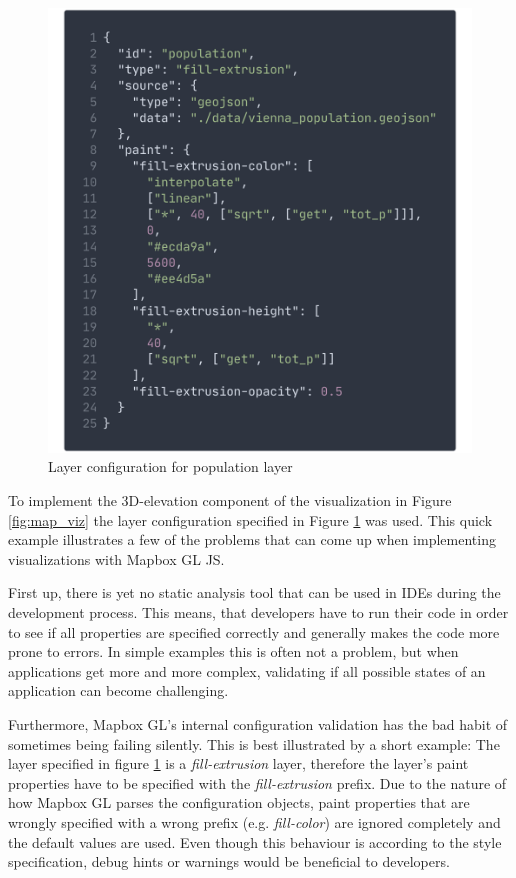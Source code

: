 \documentclass[conference]{IEEEtran}
\begin{document}
\begin{figure}
    \centering
    \includegraphics[width=\columnwidth]{img/vienna-mapbox.png}
    \caption{Layer configuration for population layer}
    \label{fig:mapbox-config}
\end{figure}
To implement the 3D-elevation component of the visualization in Figure \ref{fig:map_viz} the layer configuration specified in Figure \ref{fig:mapbox-config} was used. This quick example illustrates a few of the problems that can come up when implementing visualizations with Mapbox GL JS. 

First up, there is yet no static analysis tool that can be used in IDEs during the development process. This means, that developers have to run their code in order to see if all properties are specified correctly and generally makes the code more prone to errors. 
In simple examples this is often not a problem, but when applications get more and more complex, validating if all possible states of an application can become challenging. 

Furthermore, Mapbox GL's internal configuration validation has the bad habit of sometimes being failing silently. This is best illustrated by a short example: The layer specified in figure \ref{fig:mapbox-config} is a \textit{fill-extrusion} layer, therefore the layer's paint properties have to be specified with the \textit{fill-extrusion} prefix\cite{mapbox2020style}. 
Due to the nature of how Mapbox GL parses the configuration objects, paint properties that are wrongly specified with a wrong prefix (e.g. \textit{fill-color}) are ignored completely and the default values are used. Even though this behaviour is according to the style specification, debug hints or warnings would be beneficial to developers.
\end{document}
